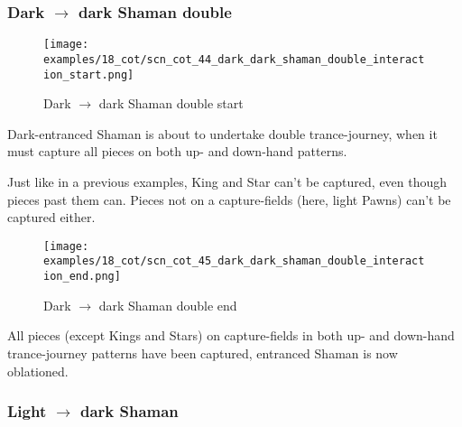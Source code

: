 \subsubsection*{Dark $\rightarrow$ dark Shaman double}
\label{sec:Conquest of Tlalocan/Trance-journey/Interactions/Dark --> dark Shaman double}

\vspace*{-1.4\baselineskip}
\noindent
\begin{figure}[!h]
\texttt{[image: examples/18\_cot/scn\_cot\_44\_dark\_dark\_shaman\_double\_interaction\_start.png]}
\caption{Dark $\rightarrow$ dark Shaman double start}
\label{fig:scn_cot_44_dark_dark_shaman_double_interaction_start}
\end{figure}

Dark-entranced Shaman is about to undertake double trance-journey, when it must
capture all pieces on both up- and down-hand patterns.

Just like in a previous examples, King and Star can't be captured, even though
pieces past them can. Pieces not on a capture-fields (here, light Pawns) can't
be captured either.

\clearpage %

\noindent
\begin{figure}[!h]
\texttt{[image: examples/18\_cot/scn\_cot\_45\_dark\_dark\_shaman\_double\_interaction\_end.png]}
\caption{Dark $\rightarrow$ dark Shaman double end}
\label{fig:scn_cot_45_dark_dark_shaman_double_interaction_end}
\end{figure}

All pieces (except Kings and Stars) on capture-fields in both up- and down-hand
trance-journey patterns have been captured, entranced Shaman is now oblationed.

\clearpage %

\subsubsection*{Light $\rightarrow$ dark Shaman}
\label{sec:Conquest of Tlalocan/Trance-journey/Interactions/Light --> dark Shaman}

